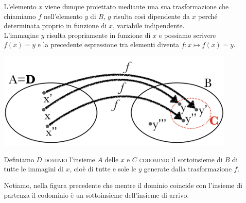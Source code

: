 L'elemento \(x\) viene dunque proiettato mediante una sua trasformazione che 
chiamiamo \(f\) nell'elemento \(y\) di \(B\), \(y\) risulta così dipendente da \(x\) 
perché determinata proprio in funzione di \(x\), variabile indipendente.\\

L'immagine \(y\) risulta propriamente in funzione di \(x\) e possiamo scrivere 
\(f(x)=y\) e la precedente espressione tra elementi diventa \(f: x\mapsto 
f(x)=y\).

\begin{minipage}{.59\textwidth}
\begin{center}
\includegraphics[width=0.9\textwidth]{img/2_funz.png}
\end{center}
\end{minipage}
\begin{minipage}{.39\textwidth}
Definiamo \(D\) \textsc{dominio} l'insieme \(A\) delle \(x\) e \(C\) 
\textsc{codominio} il sottoinsieme di \(B\) di tutte le immagini di \(x\), cioè 
di tutte e sole le \(y\) generate dalla trasformazione \(f\).

Notiamo, nella figura precedente che mentre il dominio coincide con 
l'insieme di partenza il codominio è un sottoinsieme dell'insieme di arrivo.
\end{minipage}


